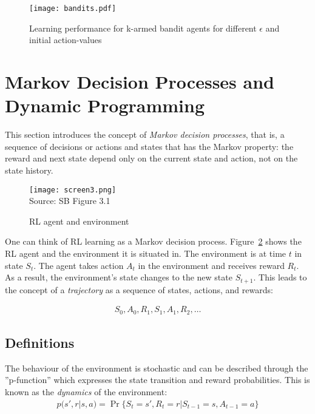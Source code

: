 \begin{figure}
\centering

\texttt{[image: bandits.pdf]}
\caption{Learning performance for k-armed bandit agents for different $\epsilon$ and initial action-values}
\label{fig:banditresults}
\end{figure}

\section{Markov Decision Processes and Dynamic Programming}

This section introduces the concept of \emph{Markov decision processes}, that is, a sequence of decisions or actions and states that has the Markov property: the reward and next state depend only on the current state and action, not on the state history.

\begin{figure}[h]
\centering
\texttt{[image: screen3.png]} \\

\scriptsize Source: SB Figure 3.1 \normalsize
\caption{RL agent and environment}
\label{fig:sb31}
\end{figure}

One can think of RL learning as a Markov decision process. Figure~\ref{fig:sb31} shows the RL agent and the environment it is situated in. The environment is at time $t$ in state $S_t$. The agent takes action $A_t$ in the environment and receives reward $R_t$. As a result, the environment's state changes to the new state $S_{t+1}$. This leads to the concept of a \emph{trajectory} as a sequence of states, actions, and rewards:

\begin{align*}S_0, A_0, R_1, S_1, A_1, R_2, \ldots
\end{align*}

\subsection{Definitions}

The behaviour of the environment is stochastic and can be described through the ''p-function'' which expresses the state transition and reward probabilities. This is known as the \emph{dynamics} of the environment: 
\begin{align}p(s', r | s, a) = \operatorname{Pr}\{S_t = s', R_t =r | S_{t-1} = s, A_{t-1} = a \} \label{eq:dynamics}
\end{align}

